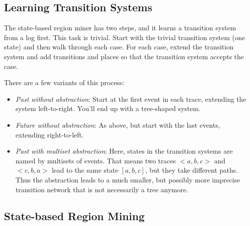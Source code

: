 \documentclass[english]{panikzettel}
\begin{document}
\subsection{Learning Transition Systems}

The state-based region miner has two steps, and it learns a transition system from a log first.
This task is trivial.
Start with the trivial transition system (one state) and then walk through each case.
For each case, extend the transition system and add transitions and places so that the transition system accepts the case.

There are a few variants of this process:
\begin{itemize}
    \item \emph{Past without abstraction}: Start at the first event in each trace, extending the system left-to-right. You'll end up with a tree-shaped system.
    \item \emph{Future without abstraction}: As above, but start with the last events, extending right-to-left.
    \item \emph{Past with multiset abstraction}: Here, states in the transition systems are named by multisets of events. That means two traces $<a,b,c>$ and $<c,b,a>$ lead to the same state $[a,b,c]$, but they take different paths. Thus the abstraction leads to a much smaller, but possibly more imprecise transition network that is not necessarily a tree anymore.
\end{itemize}

\subsection{State-based Region Mining}
\end{document}
